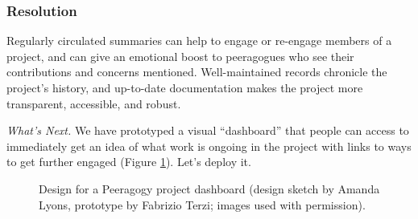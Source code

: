 \subsubsection*{Resolution} 
Regularly circulated summaries can help to engage or re-engage members of a project, and can give an emotional boost to peeragogues who see their contributions and concerns mentioned.  Well-maintained records chronicle the project's history, and up-to-date documentation makes the project more transparent, accessible, and robust.

\begin{framed}
\emph{What's Next.}
We have prototyped a visual ``dashboard'' that people can access to immediately get an idea of what work is ongoing in the project with links to ways to get further engaged (Figure \ref{dashboard}).  Let's deploy it.
\end{framed}    
\endgroup

\begin{figure}
\caption{Design for a Peeragogy project dashboard (design sketch by Amanda Lyons, prototype by Fabrizio Terzi; images used with permission).\label{dashboard}}
\end{figure}

